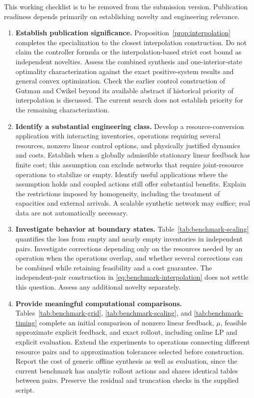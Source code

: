 \documentclass[10pt]{article}
\begin{document}
This working checklist is to be removed from the submission version. Publication readiness depends primarily on establishing novelty and engineering relevance.

\begin{enumerate}
\item \textbf{Establish publication significance.}
Proposition~\ref{prop:interpolation} completes the specialization to the closest interpolation construction. Do not claim the controller formula or the interpolation-based strict cost bound as independent novelties. Assess the combined synthesis and one-interior-state optimality characterization against the exact positive-system results and general convex optimization. Check the earlier control construction of Gutman and Cwikel \cite{gutman-cwikel} beyond its available abstract if historical priority of interpolation is discussed. The current search does not establish priority for the remaining characterization.

\item \textbf{Identify a substantial engineering class.}
Develop a resource-conversion application with interacting inventories, operations requiring several resources, nonzero linear control options, and physically justified dynamics and costs. Establish when a globally admissible stationary linear feedback has finite cost; this assumption can exclude networks that require joint-resource operations to stabilize or empty. Identify useful applications where the assumption holds and coupled actions still offer substantial benefits. Explain the restrictions imposed by homogeneity, including the treatment of capacities and external arrivals. A scalable synthetic network may suffice; real data are not automatically necessary.

\item \textbf{Investigate behavior at boundary states.}
Table~\ref{tab:benchmark-scaling} quantifies the loss from empty and nearly empty inventories in independent pairs. Investigate corrections depending only on the resources needed by an operation when the operations overlap, and whether several corrections can be combined while retaining feasibility and a cost guarantee. The independent-pair construction in \eqref{eq:benchmark-interpolation} does not settle this question. Assess any additional novelty separately.

\item \textbf{Provide meaningful computational comparisons.}
Tables~\ref{tab:benchmark-grid}, \ref{tab:benchmark-scaling}, and \ref{tab:benchmark-timing} complete an initial comparison of nonzero linear feedback, $\mu$, feasible approximate explicit feedback, and exact rollout, including online LP and explicit evaluation. Extend the experiments to operations connecting different resource pairs and to approximation tolerances selected before construction. Report the cost of generic offline synthesis as well as evaluation, since the current benchmark has analytic rollout actions and shares identical tables between pairs. Preserve the residual and truncation checks in the supplied script.


\end{enumerate}
\end{document}
